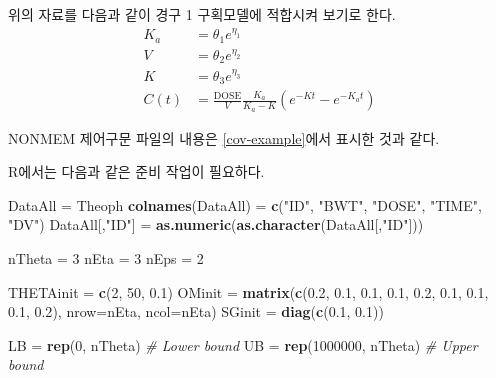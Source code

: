 \documentclass[
  11pt,
  krantz2, a4paper, twoside]{krantz}
\newenvironment{Shaded}{\begin{snugshade}}{\end{snugshade}}
\newcommand{\CommentTok}[1]{\textcolor[rgb]{0.56,0.35,0.01}{\textit{#1}}}
\newcommand{\DataTypeTok}[1]{\textcolor[rgb]{0.13,0.29,0.53}{#1}}
\newcommand{\DecValTok}[1]{\textcolor[rgb]{0.00,0.00,0.81}{#1}}
\newcommand{\FloatTok}[1]{\textcolor[rgb]{0.00,0.00,0.81}{#1}}
\newcommand{\KeywordTok}[1]{\textcolor[rgb]{0.13,0.29,0.53}{\textbf{#1}}}
\newcommand{\NormalTok}[1]{#1}
\newcommand{\StringTok}[1]{\textcolor[rgb]{0.31,0.60,0.02}{#1}}
\theoremstyle{definition}
\theoremstyle{definition}
\theoremstyle{definition}
\theoremstyle{remark}
\begin{document}
위의 자료를 다음과 같이 경구 1 구획모델에 적합시켜 보기로 한다.
\begin{equation}
\begin{split}
  K_{a} & = \theta_{1}e^{\eta_{1}} \\
  V & = \theta_{2}e^{\eta_{2}} \\
  K & = \theta_{3}e^{\eta_{3}} \\
  C(t) & = \frac{\text{DOSE}}{V}\frac{K_{a}}{K_{a} - K}(e^{- Kt} - e^{- K_{a}t})
\end{split}
\label{eq:onecompfit}
\end{equation}

NONMEM 제어구문 파일의 내용은 \ref{cov-example}에서 표시한 것과 같다.

R에서는 다음과 같은 준비 작업이 필요하다.
\small

\begin{Shaded}
\begin{Highlighting}[]
\NormalTok{DataAll =}\StringTok{ }\NormalTok{Theoph}
\KeywordTok{colnames}\NormalTok{(DataAll) =}\StringTok{ }\KeywordTok{c}\NormalTok{(}\StringTok{"ID"}\NormalTok{, }\StringTok{"BWT"}\NormalTok{, }\StringTok{"DOSE"}\NormalTok{, }\StringTok{"TIME"}\NormalTok{, }\StringTok{"DV"}\NormalTok{)}
\NormalTok{DataAll[,}\StringTok{"ID"}\NormalTok{] =}\StringTok{ }\KeywordTok{as.numeric}\NormalTok{(}\KeywordTok{as.character}\NormalTok{(DataAll[,}\StringTok{"ID"}\NormalTok{]))}

\NormalTok{nTheta =}\StringTok{ }\DecValTok{3}
\NormalTok{nEta =}\StringTok{ }\DecValTok{3}
\NormalTok{nEps =}\StringTok{ }\DecValTok{2}

\NormalTok{THETAinit =}\StringTok{ }\KeywordTok{c}\NormalTok{(}\DecValTok{2}\NormalTok{, }\DecValTok{50}\NormalTok{, }\FloatTok{0.1}\NormalTok{)}
\NormalTok{OMinit =}\StringTok{ }\KeywordTok{matrix}\NormalTok{(}\KeywordTok{c}\NormalTok{(}\FloatTok{0.2}\NormalTok{, }\FloatTok{0.1}\NormalTok{, }\FloatTok{0.1}\NormalTok{, }\FloatTok{0.1}\NormalTok{, }\FloatTok{0.2}\NormalTok{, }\FloatTok{0.1}\NormalTok{, }\FloatTok{0.1}\NormalTok{, }\FloatTok{0.1}\NormalTok{, }\FloatTok{0.2}\NormalTok{), }
                \DataTypeTok{nrow=}\NormalTok{nEta, }\DataTypeTok{ncol=}\NormalTok{nEta)}
\NormalTok{SGinit =}\StringTok{ }\KeywordTok{diag}\NormalTok{(}\KeywordTok{c}\NormalTok{(}\FloatTok{0.1}\NormalTok{, }\FloatTok{0.1}\NormalTok{))}

\NormalTok{LB =}\StringTok{ }\KeywordTok{rep}\NormalTok{(}\DecValTok{0}\NormalTok{, nTheta) }\CommentTok{\# Lower bound}
\NormalTok{UB =}\StringTok{ }\KeywordTok{rep}\NormalTok{(}\DecValTok{1000000}\NormalTok{, nTheta) }\CommentTok{\# Upper bound}


\end{Highlighting}
\end{Shaded}
\end{document}
